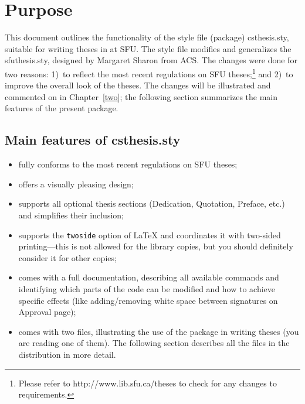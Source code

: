 
%
%

\chapter{Purpose}

This document outlines the functionality of the style file (package)
\textsf{csthesis.sty},
suitable for writing theses in \LaTeXe{} at SFU.  The style file
modifies and generalizes the
\textsf{sfuthesis.sty}, designed by
Margaret Sharon from ACS. The changes were done for two reasons: 1)~to
reflect the most recent regulations on SFU
theses;\footnote{Please refer to http://www.lib.sfu.ca/theses to check for any changes to requirements.}  and
2)~to improve the overall look of the theses. The changes will be
illustrated and commented on in Chapter~\ref{two}; the following
section summarizes the main features of the present package.

\section{Main features of \textsf{csthesis.sty}}

\begin{itemize}
\item fully conforms to the most recent regulations%
   on SFU theses;
\item offers a visually pleasing design;
\item supports all optional thesis sections
  (Dedication, Quotation, Preface, etc.) and simplifies their
  inclusion;
\item supports the \verb+twoside+%
   option of \LaTeX{}
  and coordinates it with two-sided printing---this is not allowed for the library copies, but you
  should definitely consider it for other copies;
\item comes with a full documentation, describing
  all available commands and identifying which parts of the code can
  be modified and how to achieve specific effects (like
  adding/removing white space between signatures on Approval page);
\item comes with two files, illustrating the use of the package in
  writing theses (you are reading one of them). The following section
  describes all the files in the distribution in more detail.
\end{itemize}

